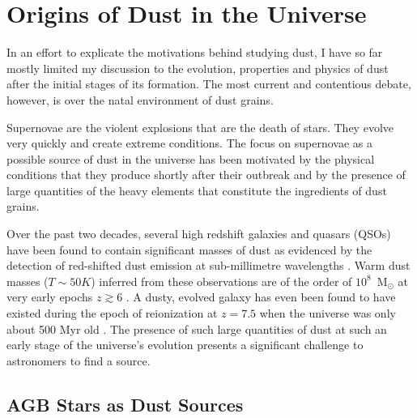 \section{Origins of Dust in the Universe}
\label{scn:ccsne}
In an effort to explicate the motivations behind studying dust, I have so far mostly limited my discussion to the evolution, properties and physics of dust after the initial stages of its formation.  The most current and contentious debate, however, is over the natal environment of dust grains.  

Supernovae are the violent explosions that are the death of stars.  They evolve very quickly and create extreme conditions.  The focus on supernovae as a possible source of dust in the universe has been motivated by the physical conditions that they produce shortly after their outbreak and by the presence of large quantities of the heavy elements that constitute the ingredients of dust grains.

Over the past two decades, several high redshift galaxies and quasars (QSOs) have been found to contain significant masses of dust as evidenced by the detection of red-shifted dust emission at sub-millimetre wavelengths \citep{Carilli2001, Omont2001, Bertoldi2002, Bertoldi2003, Watson2015}.  Warm dust masses ($T\sim50K$) inferred from these observations are of the order of $10^8$~M$_{\odot}$ at very early epochs $z \gtrsim 6$ \citep{Robson2004,Beelen2006,Dwek2007}.  A dusty, evolved galaxy has even been found to have existed during the epoch of reionization at $z=7.5$ when the universe was only about 500 Myr old \citep{Watson2015}.  The presence of such large quantities of dust at such an early stage of the universe's evolution presents a significant challenge to astronomers to find a source.  

\subsection{AGB Stars as Dust Sources}

